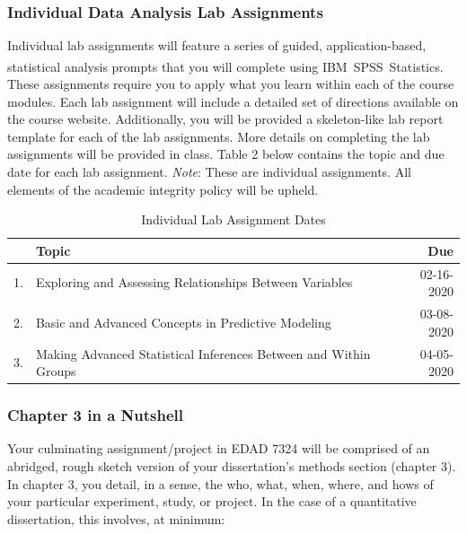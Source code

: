 \documentclass[
]{article}
\begin{document}
\subsubsection{Individual Data Analysis Lab Assignments}

Individual lab assignments will feature a series of guided,
application-based, statistical analysis prompts that you will complete
using
IBM\textsuperscript{\textregistered}~SPSS\textsuperscript{\textregistered}~Statistics.
These assignments require you to apply what you learn within each of the
course modules. Each lab assignment will include a detailed set of
directions available on the course website. Additionally, you will be
provided a skeleton-like lab report template for each of the lab
assignments. More details on completing the lab assignments will be
provided in class. Table 2 below contains the topic and due date for
each lab assignment. \emph{Note}: These are individual assignments. All
elements of the academic integrity policy will be upheld.

\begin{table}[H]
\begin{center}
\caption{Individual Lab Assignment Dates}
\label{labs}
\vspace{3mm}
\begin{tabular}{llr}
\hline
 & {\bf{Topic}} & {\bf{Due}}\\
\hline
1. & Exploring and Assessing Relationships Between Variables & 02-16-2020\\
2. & Basic and Advanced Concepts in Predictive Modeling & 03-08-2020\\
3. & Making Advanced Statistical Inferences Between and Within Groups & 04-05-2020\\
\hline
\end{tabular}
\end{center}
\end{table}

\subsubsection{Chapter 3 in a Nutshell}

Your culminating assignment/project in EDAD 7324 will be comprised of an
abridged, rough sketch version of your dissertation's methods section
(chapter 3). In chapter 3, you detail, in a sense, the who, what, when,
where, and hows of your particular experiment, study, or project. In the
case of a quantitative dissertation, this involves, at minimum:
\end{document}
